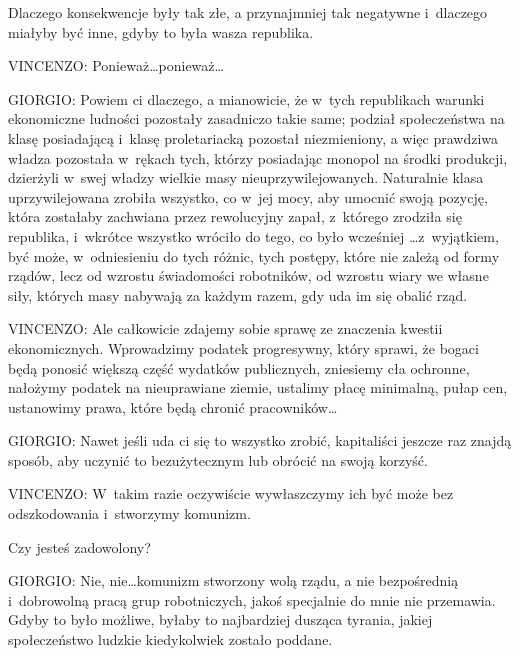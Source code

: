 \documentclass[oneside,polish,11pt,sfheadings]{mwbk}
\begin{document}
 
Dlaczego konsekwencje były tak złe, a przynajmniej tak negatywne i~dlaczego miałyby być inne, gdyby to była wasza
republika. 




 
\noindent VINCENZO: Ponieważ\ldots ponieważ\ldots 




 
\noindent GIORGIO: Powiem ci dlaczego, a mianowicie, że w~tych republikach warunki ekonomiczne ludności pozostały zasadniczo takie
same; podział społeczeństwa na klasę posiadającą i~klasę proletariacką pozostał niezmieniony, a więc prawdziwa władza
pozostała w~rękach tych, którzy posiadając monopol na środki produkcji, dzierżyli w~swej władzy wielkie masy
nieuprzywilejowanych. Naturalnie klasa uprzywilejowana zrobiła wszystko, co w~jej mocy, aby umocnić swoją pozycję,
która zostałaby zachwiana przez rewolucyjny zapał, z~którego zrodziła się republika, i~wkrótce wszystko wróciło do
tego, co było wcześniej \ldots z~wyjątkiem, być może, w~odniesieniu do tych różnic, tych postępy, które nie zależą od
formy rządów, lecz od wzrostu świadomości robotników, od wzrostu wiary we własne siły, których masy nabywają za każdym
razem, gdy uda im się obalić rząd. 




 
\noindent VINCENZO: Ale całkowicie zdajemy sobie sprawę ze znaczenia kwestii ekonomicznych. Wprowadzimy podatek progresywny, który
sprawi, że bogaci będą ponosić większą część wydatków publicznych, zniesiemy cła ochronne, nałożymy podatek na
nieuprawiane ziemie, ustalimy płacę minimalną, pułap cen, ustanowimy prawa, które będą chronić pracowników\ldots 




 
\noindent GIORGIO: Nawet jeśli uda ci się to wszystko zrobić, kapitaliści jeszcze raz znajdą sposób, aby uczynić to bezużytecznym
lub obrócić na swoją korzyść. 




 
\noindent VINCENZO: W~takim razie oczywiście wywłaszczymy ich być może bez odszkodowania i~stworzymy komunizm. 

 
Czy jesteś zadowolony? 




 
\noindent GIORGIO: Nie, nie\ldots komunizm stworzony wolą rządu, a nie bezpośrednią i~dobrowolną pracą grup robotniczych, jakoś
specjalnie do mnie nie przemawia. Gdyby to było możliwe, byłaby to najbardziej dusząca tyrania, jakiej społeczeństwo
ludzkie kiedykolwiek zostało poddane. 
\end{document}
